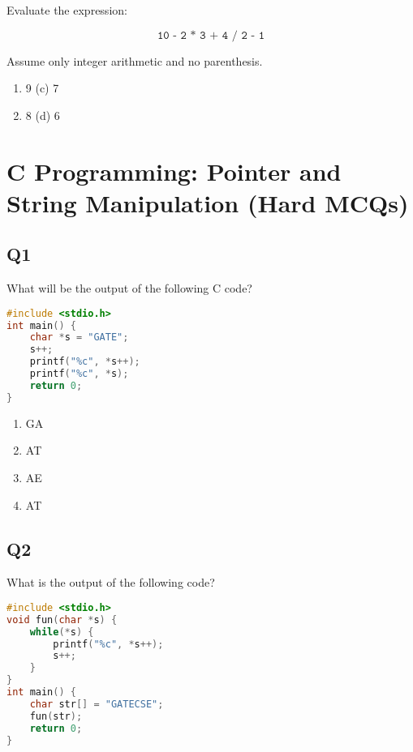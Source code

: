 Evaluate the expression:

\[
\texttt{10 - 2 * 3 + 4 / 2 - 1}
\]

Assume only integer arithmetic and no parenthesis.

\begin{enumerate}[label=(\alph*)]
    \item 9 \hspace{5cm} (c) 7
    \item 8 \hspace{5cm} (d) 6
\end{enumerate}


\section[C Programming: Pointer and String Manipulation (Hard MCQs)]
{C Programming: Pointer and\\ String Manipulation (Hard MCQs)}

\subsection*{Q1}
What will be the output of the following C code?
\begin{lstlisting}[language=C]
#include <stdio.h>
int main() {
    char *s = "GATE";
    s++;
    printf("%c", *s++);
    printf("%c", *s);
    return 0;
}
\end{lstlisting}

\begin{enumerate}[label=(\alph*)]
    \item GA  
    \item AT  
    \item AE  
    \item AT
\end{enumerate}

\subsection*{Q2}
What is the output of the following code?
\begin{lstlisting}[language=C]
#include <stdio.h>
void fun(char *s) {
    while(*s) {
        printf("%c", *s++);
        s++;
    }
}
int main() {
    char str[] = "GATECSE";
    fun(str);
    return 0;
}
\end{lstlisting}

